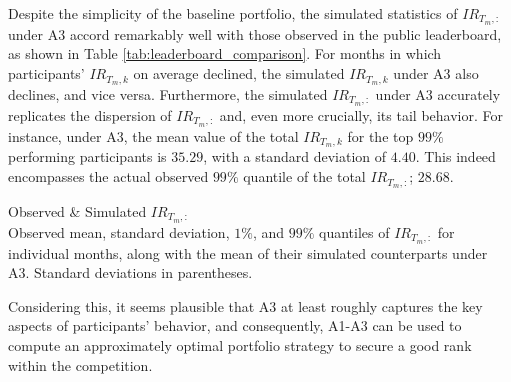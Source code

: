\documentclass[3p,times,twocolumn]{elsarticle}
\begin{document}
Despite the simplicity of the baseline portfolio, the simulated statistics of $IR_{T_{m},:}$ under A3 accord remarkably well with those observed in the public leaderboard, as shown in Table \ref{tab:leaderboard_comparison}.
For months in which participants' $IR_{T_{m},k}$ on average declined, the simulated $IR_{T_{m},k}$ under A3 also declines, and vice versa.
Furthermore, the simulated $IR_{T_{m},:}$ under A3 accurately replicates the dispersion of $IR_{T_{m},:}$ and, even more crucially, its tail behavior.
For instance, under A3, the mean value of the total $IR_{T_{m},k}$ for the top $99\%$ performing participants is $35.29$, with a standard deviation of $4.40$.
This indeed encompasses the actual observed $99\%$ quantile of the total $IR_{T_{m},:}$; $28.68$.

\begin{table}[!htbp]
    \fontsize{5.5}{5.5}\selectfont
    \centering
    \caption{
        Observed \& Simulated $IR_{T_{m},:}$\\
        \footnotesize
        Observed mean, standard deviation, $1\%$, and $99\%$ quantiles of $IR_{T_{m},:}$ for individual months, along with the mean of their simulated counterparts under A3.
        Standard deviations in parentheses.
    }
    \label{tab:leaderboard_comparison}
\end{table}

Considering this, it seems plausible that A3 at least roughly captures the key aspects of participants' behavior, and consequently, A1-A3 can be used to compute an approximately optimal portfolio strategy to secure a good rank within the competition.
\end{document}
